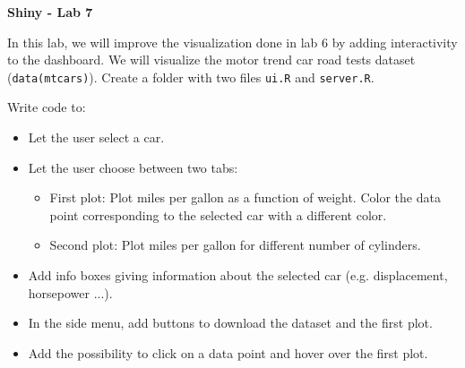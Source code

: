 \documentclass[letterpaper, 12pt]{article}
\begin{document}
\begin{center}
\textbf{\Large{Shiny - Lab 7}}
\end{center}

\vspace{2em}

In this lab, we will improve the visualization done in lab 6 by adding interactivity to the dashboard. We will visualize the motor trend car road tests dataset (\verb|data(mtcars)|). Create a folder with two files \verb|ui.R| and \verb|server.R|.

\vspace{1em}

Write code to:
\begin{itemize}
	\item Let the user select a car.
	\item Let the user choose between two tabs:
	\begin{itemize}
		\item First plot: Plot miles per gallon as a function of weight. Color the data point corresponding to the selected car with a different color.
		\item Second plot: Plot miles per gallon for different number of cylinders.
	\end{itemize}
	\item Add info boxes giving information about the selected car (e.g. displacement, horsepower ...).
	\item In the side menu, add buttons to download the dataset and the first plot.
	\item Add the possibility to click on a data point and hover over the first plot.
\end{itemize}

\vspace{1em}
 
\end{document}
